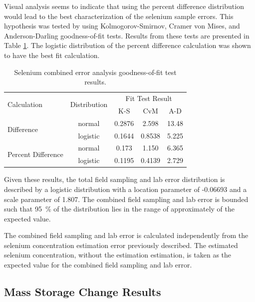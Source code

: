\begin{linenumbers}
Visual analysis seems to indicate that using the percent difference distribution would lead to the best characterization of the selenium sample errors.  This hypothesis was tested by using Kolmogorov-Smirnov, Cramer von Mises, and Anderson-Darling goodness-of-fit tests.  Results from these tests are presented in Table \ref{tab:CSeGoF}.  The logistic distribution of the percent difference calculation was shown to have the best fit calculation.

\begin{table}
  \caption[Selenium combined error analysis goodness-of-fit test results.]{Selenium combined error analysis goodness-of-fit test results.}
  \label{tab:CSeGoF}
  \centering
    \begin{tabular}{lcccc}
    \toprule
    \multirow{2}{*}{Calculation} & \multirow{2}{*}{Distribution} & \multicolumn{3}{c}{Fit Test Result}\\ \cmidrule(r{.5em}l){3-5}
     & & K-S & CvM & A-D\\
    \toprule
    \multirow{2}{*}{Difference} & normal & 0.2876 & 2.598 & 13.48\\
     & logistic & 0.1644 & 0.8538 & 5.225\\
    \midrule
    \multirow{2}{*}{Percent Difference} & normal & 0.173 & 1.150 & 6.365\\
     & logistic & 0.1195 & 0.4139 & 2.729\\
    \bottomrule
    \end{tabular}%
\end{table}%

Given these results, the total field sampling and lab error distribution is described by a logistic distribution with a location parameter of -0.06693 and a scale parameter of 1.807.  The combined field sampling and lab error is bounded such that \SI{95}{\percent} of the distribution lies in the range of approximately  of the expected value.

The combined field sampling and lab error is calculated independently from the selenium concentration estimation error previously described.  The estimated selenium concentration, without the estimation estimation, is taken as the expected value for the combined field sampling and lab error. 

\subsection{Mass Storage Change Results}


\end{linenumbers}
